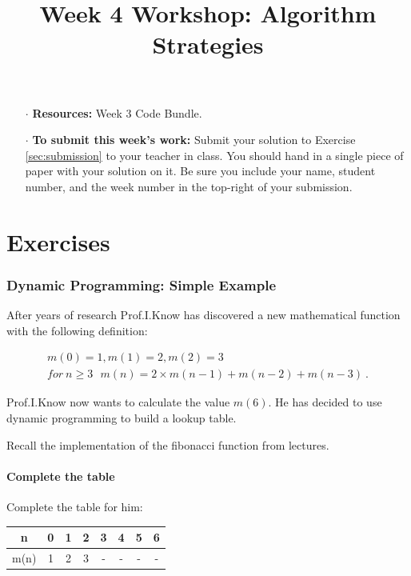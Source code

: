 \documentclass[twoside=false,DIV=14]{scrartcl}
\title{\color{redish} \vspace{-2em}Week 4 Workshop: Algorithm Strategies}
\begin{document}
{\color{blackish}\maketitle}\vspace{-2em}%
\begin{itemize}
    \item[$\cdot$] {\bf Resources:}  Week 3  Code Bundle.
    \item[$\cdot$] {\bf To submit this week's work:} Submit your solution to Exercise \ref{sec:submission} to your teacher in class.  You should hand in a single piece of paper with your solution on it.  Be sure you include your name, student number, and the week number in the top-right of your submission.
\end{itemize}

\part*{Exercises}

\section{Dynamic Programming: Simple Example}

After years of research Prof.\@ I.\@ Know has discovered a new mathematical function with the following definition:

\[
\begin{array}{l}
m(0) =1,  m(1) = 2,  m(2) = 3\\ 
\textit{for}~ n \geq 3 ~~~ m(n) = 2\times m(n{-}1) +  m(n{-}2) + m(n{-}3)~.
\end{array}
\]

Prof.\@ I.\@ Know now wants to calculate the value $m(6)$. He has decided to use dynamic programming to build a lookup table.
\begin{hint}
    Recall the implementation of the fibonacci function from lectures.
\end{hint}
    
\subsection{Complete the table}
Complete the table for him:

\begin{tabular}{|c||c|c|c|c|c|c|c|}
\hline
n&0&1&2&3&4&5&6\\
\hline
m(n)&1&2&3&-&-&-&-\\
\hline
\end{tabular}
\end{document}
